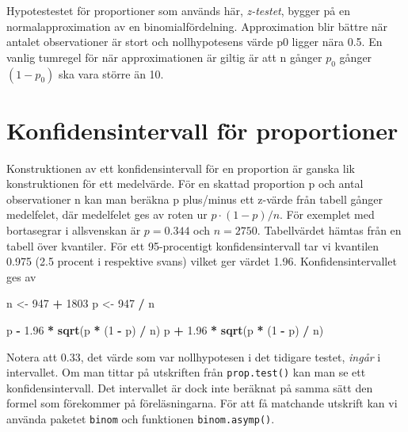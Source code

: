 \documentclass[
]{book}
\newenvironment{Shaded}{\begin{snugshade}}{\end{snugshade}}
\newcommand{\DecValTok}[1]{\textcolor[rgb]{0.00,0.00,0.81}{#1}}
\newcommand{\FloatTok}[1]{\textcolor[rgb]{0.00,0.00,0.81}{#1}}
\newcommand{\FunctionTok}[1]{\textcolor[rgb]{0.13,0.29,0.53}{\textbf{#1}}}
\newcommand{\NormalTok}[1]{#1}
\newcommand{\OtherTok}[1]{\textcolor[rgb]{0.56,0.35,0.01}{#1}}
\newcommand{\SpecialCharTok}[1]{\textcolor[rgb]{0.81,0.36,0.00}{\textbf{#1}}}
\theoremstyle{definition}
\theoremstyle{definition}
\theoremstyle{definition}
\theoremstyle{definition}
\theoremstyle{remark}
\begin{document}
Hypotestestet för proportioner som används här, \emph{z-testet}, bygger på en normalapproximation av en binomialfördelning. Approximation blir bättre när antalet observationer är stort och nollhypotesens värde p0 ligger nära 0.5. En vanlig tumregel för när approximationen är giltig är att n gånger \(p_0\) gånger \((1 - p_0)\) ska vara större än 10.

\section{Konfidensintervall för proportioner}\label{konfidensintervall-fuxf6r-proportioner}

Konstruktionen av ett konfidensintervall för en proportion är ganska lik konstruktionen för ett medelvärde. För en skattad proportion p och antal observationer n kan man beräkna p plus/minus ett z-värde från tabell gånger medelfelet, där medelfelet ges av roten ur \(p \cdot (1 - p) / n\). För exemplet med bortasegrar i allsvenskan är \(p = 0.344\) och \(n = 2750\). Tabellvärdet hämtas från en tabell över kvantiler. För ett 95-procentigt konfidensintervall tar vi kvantilen 0.975 (2.5 procent i respektive svans) vilket ger värdet 1.96. Konfidensintervallet ges av

\begin{Shaded}
\begin{Highlighting}[]
\NormalTok{n }\OtherTok{\textless{}{-}} \DecValTok{947} \SpecialCharTok{+} \DecValTok{1803}
\NormalTok{p }\OtherTok{\textless{}{-}} \DecValTok{947} \SpecialCharTok{/}\NormalTok{ n}

\NormalTok{p }\SpecialCharTok{{-}} \FloatTok{1.96} \SpecialCharTok{*} \FunctionTok{sqrt}\NormalTok{(p }\SpecialCharTok{*}\NormalTok{ (}\DecValTok{1} \SpecialCharTok{{-}}\NormalTok{ p) }\SpecialCharTok{/}\NormalTok{ n)}
\NormalTok{p }\SpecialCharTok{+} \FloatTok{1.96} \SpecialCharTok{*} \FunctionTok{sqrt}\NormalTok{(p }\SpecialCharTok{*}\NormalTok{ (}\DecValTok{1} \SpecialCharTok{{-}}\NormalTok{ p) }\SpecialCharTok{/}\NormalTok{ n)}
\end{Highlighting}
\end{Shaded}

Notera att 0.33, det värde som var nollhypotesen i det tidigare testet, \emph{ingår} i intervallet. Om man tittar på utskriften från \texttt{prop.test()} kan man se ett konfidensintervall. Det intervallet är dock inte beräknat på samma sätt den formel som förekommer på föreläsningarna. För att få matchande utskrift kan vi använda paketet \texttt{binom} och funktionen \texttt{binom.asymp()}.
\end{document}
